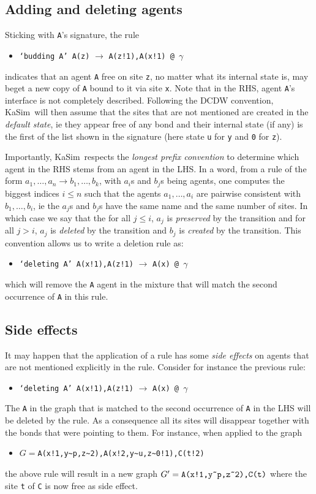 \documentclass[11pt]{book}
\def\KaSim{\textsf{KaSim}}
\def\int{\hbox{\texttt{\~}}}
\def\ttt#1{\texttt{#1}}
\def\rar{\rightarrow}
\def\ga{\gamma}
\def\ie{ie }
\def\via{via }
\def\ITE#1{\begin{itemize}#1\end{itemize}}
\begin{document}
\subsection{Adding and deleting agents}
Sticking with \ttt{A}'s signature, the rule
\ITE{
\item[] \ttt{`budding A' A(z)} $\rar$ \ttt{A(z!1),A(x!1) @ $\ga$ } 
}
indicates that an agent \ttt{A} free on site \ttt{z}, no matter what its internal state is, may beget a new copy of \ttt{A} bound to it \via site \ttt{x}. Note that in the RHS, agent \ttt{A}'s interface is not completely described. Following the DCDW convention, \KaSim~will then assume that the sites that are not mentioned are created in the \emph{default state}, \ie they appear free of any bond and their internal state (if any) is the first of the list shown in the signature (here state \ttt{u} for \ttt{y} and \ttt{0} for \ttt{z}).

Importantly, \KaSim~respects the \emph{longest prefix convention} to determine which agent in the RHS stems from an agent in the LHS. 
In a word, from a rule of the form $a_1,\dots,a_n\rar b_1,\dots,b_k$, with $a_i$s and $b_j$s being agents, one computes the biggest indices $i\leq n$ such that the agents $a_1,\dots,a_i$ are pairwise consistent with $b_1,\dots,b_i$, \ie the $a_j$s and $b_j$s have the same name and the same number of sites. In which case we say that the for all $j\leq i$, $a_j$ is \emph{preserved} by the transition and for all $j>i$, $a_j$ is \emph{deleted} by the transition and $b_j$ is \emph{created} by the transition. This convention allows us to write a deletion rule as:
\ITE{
\item[] \ttt{`deleting A' A(x!1),A(z!1)} $\rar$ \ttt{A(x) @ $\ga$} 
}
which will remove the \ttt{A} agent in the mixture that will match the second occurrence of \ttt{A} in this rule.

\subsection{Side effects}\label{sec:side-effect}

It may happen that the application of a rule has some \emph{side effects} on agents that are not mentioned explicitly in the rule. Consider for instance the previous rule:
\ITE{
\item[] \ttt{`deleting A' A(x!1),A(z!1)} $\rar$ \ttt{A(x) @ $\ga$} 
}
The \ttt{A} in the graph that is matched to the second occurrence of \ttt{A} in the LHS will be deleted by the rule. As a consequence all its sites will disappear together with the bonds that were pointing to them. For instance, when applied to the graph 
\ITE{
\item[] $G=$\ttt{A(x!1,y\int p,z\int2),A(x!2,y\int u,z\int0!1),C(t!2)}
} 
the above rule will result in a new graph $G'=\ttt{A(x!1,y\int p,z\int2),C(t)}$ where the site \ttt{t} of \ttt{C} is now free as side effect.
\end{document}
